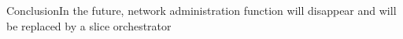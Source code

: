 \begin{frame}{Conclusion}{In the future, network administration function will disappear and will be replaced by a slice orchestrator}
\end{frame}



